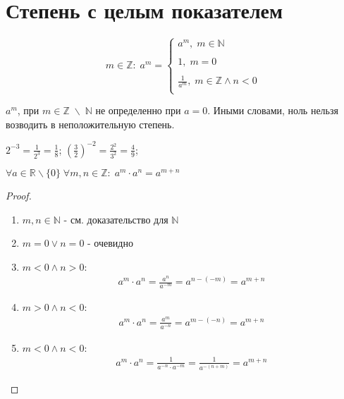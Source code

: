 \section{Степень с целым показателем}

\begin{definition}
    \[
        m \in \mathbb{Z}: \; a^m = 
        \left\{
        \begin{array}{l}
            a^m, \; m \in \mathbb{N} \\ \\
            1, \; m = 0 \\ \\
            \frac{1}{a^m}, \; m \in  \mathbb{Z} \land n < 0 \\
        \end{array}\right.
    \]
\end{definition}

\begin{remark}
    $a^m$, при $m \in \mathbb{Z} \; \backslash \; \mathbb{N}$ не определенно при $a = 0$. Иными словами, ноль нельзя возводить в неположительную степень.
\end{remark}

\begin{example}
    $2^{-3} = \frac{1}{2^3} = \frac{1}{8}$; $(\frac{3}{2})^{-2} = \frac{2^2}{3^2} = \frac{4}{9}$;
\end{example}

\begin{theorem}
    $\forall a \in \mathbb{R} \backslash \{0\} \; \forall m, n \in \mathbb{Z}: \; a^m \cdot a^n = a^{m + n}$
\end{theorem}

\begin{proof}
    \hfill

    \begin{enumerate}
        \item $m,n \in \mathbb{N}$ - см. доказательство для $\mathbb{N}$
        \item $m = 0 \lor n = 0$ - очевидно
        \item $m < 0 \land n > 0$:
        \begin{align*}
            a^m \cdot a^n = \frac{a^n}{a^{-m}} = a^{n - (-m)} = a^{m + n}
        \end{align*}
        \item $m > 0 \land n < 0$:
        \begin{align*}
            a^m \cdot a^n = \frac{a^m}{a^{-n}} = a^{m - (-n)} = a^{m + n}
        \end{align*}
        \item $m < 0 \land n < 0$:
        \begin{align*}
            a^m \cdot a^n = \frac{1}{a^{-n} \cdot a^{-m}} = \frac{1}{a^{-(n+m)}} = a^{m + n}
        \end{align*}
    \end{enumerate}
\end{proof}

